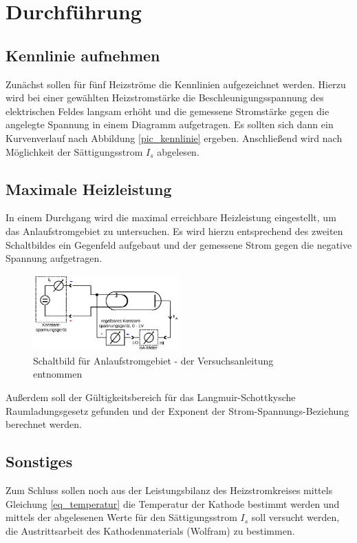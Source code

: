 \section{Durchführung}
\subsection{Kennlinie aufnehmen}
Zunächst sollen für fünf Heizströme die Kennlinien aufgezeichnet werden. Hierzu wird  bei einer gewählten Heizstromstärke die Beschleunigungsspannung des elektrischen Feldes langsam erhöht und die gemessene Stromstärke gegen die angelegte Spannung in einem Diagramm aufgetragen. Es sollten sich dann ein Kurvenverlauf nach Abbildung \ref{pic_kennlinie} ergeben. Anschließend wird nach Möglichkeit der Sättigungsstrom $I_s$ abgelesen.
\subsection{Maximale Heizleistung}
In einem Durchgang wird die maximal erreichbare Heizleistung eingestellt, um das Anlaufstromgebiet zu untersuchen. Es wird hierzu entsprechend des zweiten Schaltbildes ein Gegenfeld aufgebaut und der gemessene Strom gegen die negative Spannung aufgetragen.
\begin{figure}[H]
\includegraphics[width=0.5\textwidth]{pics/aufbau2.jpg}
\caption{Schaltbild für Anlaufstromgebiet - der Versuchsanleitung entnommen}
\end{figure}

Außerdem soll der Gültigkeitsbereich für das Langmuir-Schottkysche Raumladungsgesetz gefunden und der Exponent der Strom-Spannungs-Beziehung berechnet werden.
\subsection{Sonstiges}
Zum Schluss sollen noch aus der Leistungsbilanz des Heizstromkreises mittels Gleichung \eqref{eq_temperatur} die Temperatur der Kathode bestimmt werden und mittels der abgelesenen Werte für den Sättigungsstrom $I_s$ soll versucht werden, die Austrittsarbeit des Kathodenmaterials (Wolfram) zu bestimmen.


